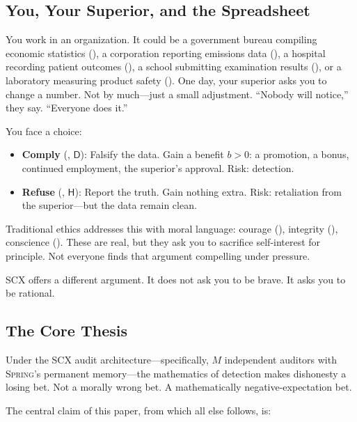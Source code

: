 \documentclass[11pt,a4paper]{article}
\theoremstyle{definition}
\theoremstyle{remark}
\newcommand{\SCX}{\textsc{SCX}}
\newcommand{\Spring}{\textsc{Spring}}
\newcommand{\honest}{\mathsf{H}}
\newcommand{\dishonest}{\mathsf{D}}
\begin{document}
\subsection{You, Your Superior, and the Spreadsheet }

You work in an organization. It could be a government bureau compiling economic statistics (), a corporation reporting emissions data (), a hospital recording patient outcomes (), a school submitting examination results (), or a laboratory measuring product safety (). One day, your superior asks you to change a number. Not by much---just a small adjustment. ``Nobody will notice,'' they say. ``Everyone does it.''

You face a choice:
\begin{itemize}[nosep]
    \item \textbf{Comply} (, $\dishonest$): Falsify the data. Gain a benefit $b > 0$: a promotion, a bonus, continued employment, the superior's approval. Risk: detection.
    \item \textbf{Refuse} (, $\honest$): Report the truth. Gain nothing extra. Risk: retaliation from the superior---but the data remain clean.
\end{itemize}

Traditional ethics addresses this with moral language: courage (), integrity (), conscience (). These are real, but they ask you to sacrifice self-interest for principle. Not everyone finds that argument compelling under pressure.

\SCX{} offers a different argument. It does not ask you to be brave. It asks you to be rational.

\subsection{The Core Thesis }

Under the \SCX{} audit architecture---specifically, $M$ independent auditors with \Spring{}'s permanent memory---the mathematics of detection makes dishonesty a losing bet. Not a morally wrong bet. A mathematically negative-expectation bet.

The central claim of this paper, from which all else follows, is:

\begin{center}
\end{center}
\end{document}
